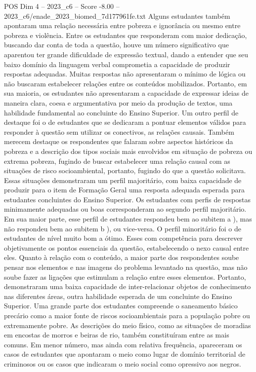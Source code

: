 \begin{textsample}{POS Dim 4 – 2023\_c6 – Score -8.00 – 2023\_c6/enade\_2023\_biomed\_7d177961fe.txt}
Alguns estudantes também apontaram uma relação necessária entre pobreza e ignorância ou mesmo entre pobreza e violência.
Entre os estudantes que responderam com maior dedicação, buscando dar conta de toda a questão, houve um número significativo que aparentou ter grande dificuldade de expressão textual, dando a entender que seu baixo domínio da linguagem verbal comprometia a capacidade de produzir respostas adequadas.
Muitas respostas não apresentaram o mínimo de lógica ou não buscaram estabelecer relações entre os conteúdos mobilizados.
Portanto, em sua maioria, os estudantes não apresentaram a capacidade de expressar ideias de maneira clara, coesa e argumentativa por meio da produção de textos, uma habilidade fundamental ao concluinte do Ensino Superior.
Um outro perfil de destaque foi o de estudantes que se dedicaram a pontuar elementos válidos para responder à questão sem utilizar os conectivos, as relações causais.
Também merecem destaque os respondentes que falaram sobre aspectos históricos da pobreza e a descrição dos tipos sociais mais envolvidos em situação de pobreza ou extrema pobreza, fugindo de buscar estabelecer uma relação causal com as situações de risco socioambiental, portanto, fugindo do que a questão solicitava.
Essas situações demonstraram um perfil majoritário, com baixa capacidade de produzir para o item de Formação Geral uma resposta adequada esperada para estudantes concluintes do Ensino Superior.
Os estudantes com perfis de respostas minimamente adequadas ou boas corresponderam ao segundo perfil majoritário.
Em sua maior parte, esse perfil de estudantes respondeu bem ao subitem a ), mas não respondeu bem ao subitem b ), ou vice-versa.
O perfil minoritário foi o de estudantes de nível muito bom a ótimo.
Esses com competência para descrever objetivamente os pontos essenciais da questão, estabelecendo o nexo causal entre eles.
Quanto à relação com o conteúdo, a maior parte dos respondentes soube pensar nos elementos e nas imagens do problema levantado na questão, mas não soube fazer as ligações que estimulam a relação entre esses elementos.
Portanto, demonstraram uma baixa capacidade de inter-relacionar objetos de conhecimento nas diferentes áreas, outra habilidade esperada de um concluinte do Ensino Superior.
Uma grande parte dos estudantes compreende o saneamento básico precário como a maior fonte de riscos socioambientais para a população pobre ou extremamente pobre.
As descrições do meio físico, como as situações de moradias em encostas de morros e beiras de rio, também constituíram entre as mais comuns.
Em menor número, mas ainda com relativa frequência, apareceram os casos de estudantes que apontaram o meio como lugar de domínio territorial de criminosos ou os casos que indicaram o meio social como opressivo aos negros.

\end{textsample}
